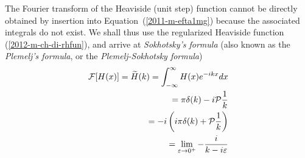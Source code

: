 The Fourier transform  of the Heaviside (unit step) function
cannot be directly obtained by insertion into Equation~(\ref{2011-m-efta1mg})
because the associated integrals do not exist.
We shall thus use the  regularized Heaviside function (\ref{2012-m-ch-di-rhfun}), and arrive at
{\em Sokhotsky's  formula} (also known as the {\em Plemelj's  formula}, or the {\em Plemelj-Sokhotsky formula})
\begin{equation}
\begin{split}
 {\cal F}[H(x)]=\widetilde{H}(k)=   \int_{-\infty}^\infty  H(x) e^{-i{kx}} dx   \\
=    \pi \delta(k) -  i {\cal P}  \frac{1}{k} \\
=   -i \left(i\pi \delta(k) + {\cal P} \frac{1}{k}\right)\\
=   \lim_{\varepsilon \rightarrow 0^+} -\frac{i}{k-i\varepsilon }
\end{split}
\label{2019-mm-ch-di-fthusf}
\end{equation}

